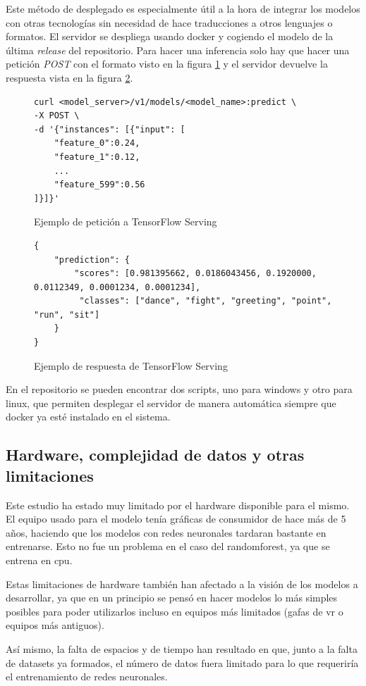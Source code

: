 Este método de desplegado es especialmente útil a la hora de integrar los modelos con otras tecnologías sin necesidad de hace traducciones a otros lenguajes o formatos. El servidor se despliega usando docker y cogiendo el modelo de la última \textit{release} del repositorio. Para hacer una inferencia solo hay que hacer una petición \textit{POST} con el formato visto en la figura \ref{fig:ejemplo-petición} y el servidor devuelve la respuesta vista en la figura \ref{fig:ejemplo-respuesta}.

\begin{figure}[H]
    \centering
    \begin{lstlisting}[style=custombash]
curl <model_server>/v1/models/<model_name>:predict \
-X POST \
-d '{"instances": [{"input": [
    "feature_0":0.24,
    "feature_1":0.12,
    ... 
    "feature_599":0.56
]}]}'
    \end{lstlisting}
    \caption{Ejemplo de petición a TensorFlow Serving}
    \label{fig:ejemplo-petición}
\end{figure}

\begin{figure}[H]
    \centering
    \begin{lstlisting}[style=custombash]
{
    "prediction": {
        "scores": [0.981395662, 0.0186043456, 0.1920000, 0.0112349, 0.0001234, 0.0001234],
         "classes": ["dance", "fight", "greeting", "point", "run", "sit"]
    }
}
    \end{lstlisting}
    \caption{Ejemplo de respuesta de TensorFlow Serving}
    \label{fig:ejemplo-respuesta}
\end{figure}

En el repositorio se pueden encontrar dos scripts, uno para windows y otro para linux, que permiten desplegar el servidor de manera automática siempre que docker ya esté instalado en el sistema.

\subsection{Hardware, complejidad de datos y otras limitaciones}

Este estudio ha estado muy limitado por el hardware disponible para el mismo. El equipo usado para el modelo tenía gráficas de consumidor de hace más de 5 años, haciendo que los modelos con redes neuronales tardaran bastante en entrenarse. Esto no fue un problema en el caso del \gls{randomforest}, ya que se entrena en \gls{cpu}.

Estas limitaciones de hardware también han afectado a la visión de los modelos a desarrollar, ya que en un principio se pensó en hacer modelos lo más simples posibles para poder utilizarlos incluso en equipos más limitados (gafas de \gls{vr} o equipos más antiguos).

Así mismo, la falta de espacios y de tiempo han resultado en que, junto a la falta de datasets ya formados, el número de datos fuera limitado para lo que requeriría el entrenamiento de redes neuronales.